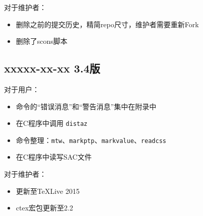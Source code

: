 对于维护者：
\begin{itemize}
\item 删除之前的提交历史，精简repo尺寸，维护者需要重新Fork
\item 删除了scons脚本
\end{itemize}

\subsection*{xxxxx-xx-xx 3.4版}
对于用户：
\begin{itemize}
\item 命令的``错误消息''和``警告消息''集中在附录中
\item 在C程序中调用 \texttt{distaz}
\item 命令整理：\texttt{mtw}、\texttt{markptp}、\texttt{markvalue}、\texttt{readcss}
\item 在C程序中读写SAC文件
\end{itemize}

对于维护者：
\begin{itemize}
\item 更新至TeXLive 2015
\item ctex宏包更新至2.2
\end{itemize}